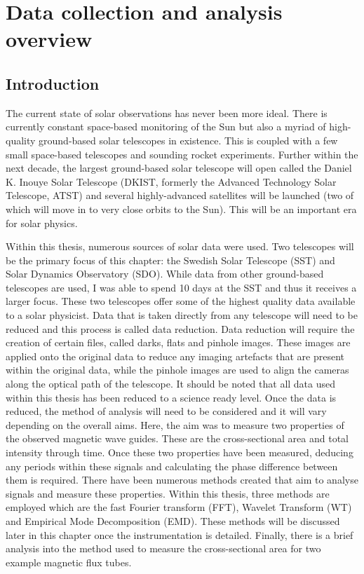 \graphicspath{{Chapter2/Figs/}}

\chapter{Data collection and analysis overview}
\label{chapter2}
	
	\vspace*{\fill}\par
    \pagebreak
	 
\section{Introduction}

	The current state of solar observations has never been more ideal.
	There is currently constant space-based monitoring of the Sun but also a myriad of high-quality ground-based solar telescopes in existence.
    This is coupled with a few small space-based telescopes and sounding rocket experiments.
	Further within the next decade, the largest ground-based solar telescope will open called the Daniel K. Inouye Solar Telescope (DKIST, formerly the Advanced Technology Solar Telescope, ATST) and several highly-advanced satellites will be launched (two of which will move in to very close orbits to the Sun).
	This will be an important era for solar physics.
	
	Within this thesis, numerous sources of solar data were used.
	Two telescopes will be the primary focus of this chapter: the Swedish Solar Telescope (SST) and Solar Dynamics Observatory (SDO).
	While data from other ground-based telescopes are used, I was able to spend 10 days at the SST and thus it receives a larger focus.
	These two telescopes offer some of the highest quality data available to a solar physicist.
	Data that is taken directly from any telescope will need to be reduced and this process is called data reduction. 
	Data reduction will require the creation of certain files, called darks, flats and pinhole images.
	These images are applied onto the original data to reduce any imaging artefacts that are present within the original data, while the pinhole images are used to align the cameras along the optical path of the telescope.
	It should be noted that all data used within this thesis has been reduced to a science ready level.
	Once the data is reduced, the method of analysis will need to be considered and it will vary depending on the overall aims.
	Here, the aim was to measure two properties of the observed magnetic wave guides.
    These are the cross-sectional area and total intensity through time.
    Once these two properties have been measured, deducing any periods within these signals and calculating the phase difference between them is required.
    There have been numerous methods created that aim to analyse signals and measure these properties.
    Within this thesis, three methods are employed which are the fast Fourier transform (FFT), Wavelet Transform (WT) and Empirical Mode Decomposition (EMD).  
    These methods will be discussed later in this chapter once the instrumentation is detailed.
    Finally, there is a brief analysis into the method used to measure the cross-sectional area for two example magnetic flux tubes.
	
